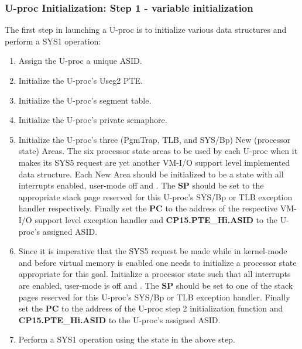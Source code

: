 \subsubsection{U-proc Initialization: Step 1 - variable initialization}
The first step in launching a U-proc is to initialize various data structures and perform a SYS1 operation:
\begin{enumerate}
\item Assign the U-proc a unique ASID.
\item Initialize the U-proc's Useg2 PTE.
\item Initialize the U-proc's segment table.
\item Initialize the U-proc's private semaphore.
\item Initialize the U-proc's three (PgmTrap, TLB, and SYS/Bp) New (processor state) Areas. 
The six processor state areas to be used by each U-proc when it makes its SYS5 request are yet another VM-I/O support level implemented data structure. 
Each New Area should be initialized to be a state with all interrupts enabled, user-mode off and \vmon{}.
The \textbf{SP} should be set to the appropriate stack page reserved for this U-proc's SYS/Bp or TLB exception handler respectively. 
Finally set the \textbf{PC} to the address of the respective VM-I/O support level exception handler and \textbf{CP15.PTE\_Hi.ASID} to the U-proc's assigned ASID.
\item Since it is imperative that the SYS5 request be made while in kernel-mode and before virtual memory is enabled one needs to initialize a processor state appropriate for this goal. 
Initialize a processor state such that all interrupts are enabled, user-mode is off and \vmoff{}. 
The \textbf{SP} should be set to one of the stack pages reserved for this U-proc's SYS/Bp or TLB exception handler. 
Finally set the \textbf{PC} to the address of the U-proc step 2 initialization function and \textbf{CP15.PTE\_Hi.ASID} to the U-proc's assigned ASID.
\item Perform a SYS1 operation using the state in the above step.
\end{enumerate}


